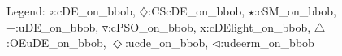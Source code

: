 Legend: {\color{CornflowerBlue}$\circ$}:cDE\_on\_bbob, {{}$\diamondsuit$}:CScDE\_on\_bbob, {\color{Green}$\star$}:cSM\_on\_bbob, {\color{red}+}:uDE\_on\_bbob, {\color{brown}$\triangledown$}:cPSO\_on\_bbob, {{}x}:cDElight\_on\_bbob, {{}$\triangle$}:OEuDE\_on\_bbob, {{}$\Diamond$}:ucde\_on\_bbob, {{}$\triangleleft$}:udeerm\_on\_bbob